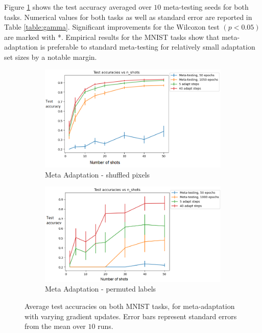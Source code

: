 \documentclass{article} %
\theoremstyle{definition}
\begin{document}
Figure \ref{fig:results-pixels} shows the test accuracy averaged over $10$ meta-testing seeds for both tasks.
Numerical values for both tasks as well as standard error are reported in Table \ref{table:gamma}. Significant improvements for the Wilcoxon test $(p<0.05)$ are marked with *.  Empirical results for the MNIST tasks show that meta-adaptation is preferable to standard meta-testing for relatively small adaptation set sizes by a notable margin.


\begin{figure}[h!]
	\centering
	\begin{subfigure}[b]{0.45\textwidth}
		\centering
		\includegraphics[width=\textwidth]{test_accuracies_pixels_const}
		\caption{Meta Adaptation - shuffled pixels}
	\end{subfigure}
	\hfill
	\begin{subfigure}[b]{0.45\textwidth}
		\centering
		\includegraphics[width=\textwidth]{test_accuracies_labels_const}
		\caption{Meta Adaptation - permuted labels}	 	
	\end{subfigure}
	\hfill
	\caption{Average test accuracies on both MNIST tasks, for meta-adaptation with varying gradient updates. Error bars represent standard errors from the mean over $10$ runs.}	 
	\label{fig:results-pixels}
\end{figure}
\end{document}
